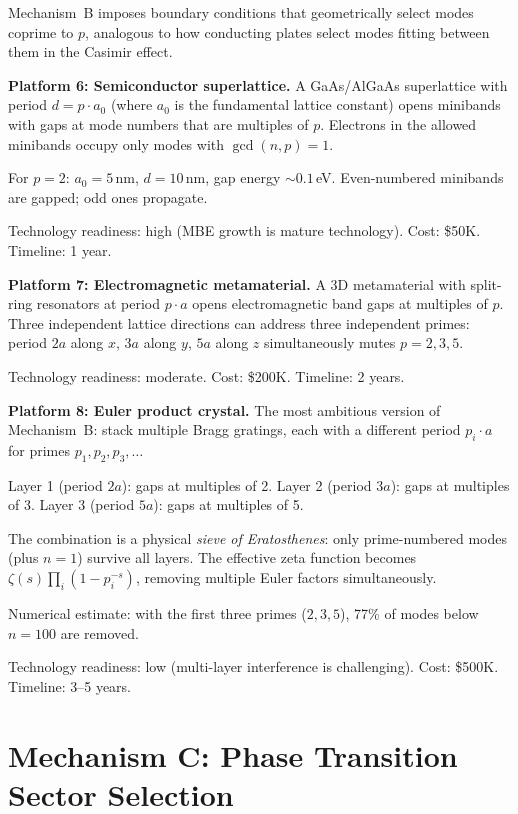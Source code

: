 \documentclass[11pt,a4paper]{article}
\begin{document}
Mechanism~B imposes boundary conditions that geometrically
select modes coprime to $p$, analogous to how conducting plates
select modes fitting between them in the Casimir effect.

\textbf{Platform 6: Semiconductor superlattice.}
A GaAs/AlGaAs superlattice with period $d = p \cdot a_0$
(where $a_0$ is the fundamental lattice constant) opens
minibands with gaps at mode numbers that are multiples of $p$.
Electrons in the allowed minibands occupy only modes
with $\gcd(n, p) = 1$.

For $p = 2$: $a_0 = 5$\,nm, $d = 10$\,nm, gap energy $\sim 0.1$\,eV.
Even-numbered minibands are gapped; odd ones propagate.

Technology readiness: high (MBE growth is mature technology).
Cost: \$50K. Timeline: 1 year.

\textbf{Platform 7: Electromagnetic metamaterial.}
A 3D metamaterial with split-ring resonators at period $p \cdot a$
opens electromagnetic band gaps at multiples of $p$.
Three independent lattice directions can address three independent
primes: period $2a$ along $x$, $3a$ along $y$, $5a$ along $z$
simultaneously mutes $p = 2, 3, 5$.

Technology readiness: moderate. Cost: \$200K. Timeline: 2 years.

\textbf{Platform 8: Euler product crystal.}
The most ambitious version of Mechanism~B: stack multiple
Bragg gratings, each with a different period $p_i \cdot a$
for primes $p_1, p_2, p_3, \ldots$

Layer 1 (period $2a$): gaps at multiples of 2.
Layer 2 (period $3a$): gaps at multiples of 3.
Layer 3 (period $5a$): gaps at multiples of 5.

The combination is a physical \emph{sieve of Eratosthenes}:
only prime-numbered modes (plus $n = 1$) survive all layers.
The effective zeta function becomes
$\zeta(s) \prod_{i} (1 - p_i^{-s})$, removing multiple
Euler factors simultaneously.

Numerical estimate: with the first three primes ($2, 3, 5$),
77\% of modes below $n = 100$ are removed.

Technology readiness: low (multi-layer interference is challenging).
Cost: \$500K. Timeline: 3--5 years.

\section{Mechanism C: Phase Transition Sector Selection}
\label{sec:mech_c}
\end{document}
